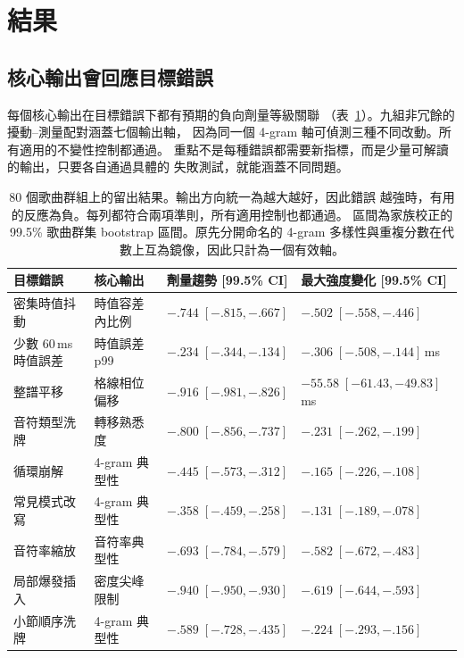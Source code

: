 \documentclass[10pt,twocolumn]{article}
\newcommand{\tabref}[1]{表~\ref{#1}}
\begin{document}
\section{結果}\label{sec:results}

\subsection{核心輸出會回應目標錯誤}
\label{sec:sensitivity}

每個核心輸出在目標錯誤下都有預期的負向劑量等級關聯
（\tabref{tab:confirmation}）。九組非冗餘的擾動--測量配對涵蓋七個輸出軸，
因為同一個 4-gram 軸可偵測三種不同改動。所有適用的不變性控制都通過。
重點不是每種錯誤都需要新指標，而是少量可解讀的輸出，只要各自通過具體的
失敗測試，就能涵蓋不同問題。

\begin{table}[t]
\centering
\scriptsize
\setlength{\tabcolsep}{3.5pt}
\begin{tabular}{@{}p{}p{}p{}p{}@{}}
\toprule
目標錯誤 & 核心輸出 & 劑量趨勢 [99.5\% CI] &
最大強度變化 [99.5\% CI] \\
\midrule
密集時值抖動 & 時值容差內比例 & $-.744\;[-.815,-.667]$ & $-.502\;[-.558,-.446]$ \\
少數 60\,ms 時值誤差 & 時值誤差 p99 & $-.234\;[-.344,-.134]$ & $-.306\;[-.508,-.144]$\,ms \\
整譜平移 & 格線相位偏移 & $-.916\;[-.981,-.826]$ & $-55.58\;[-61.43,-49.83]$\,ms \\
音符類型洗牌 & 轉移熟悉度 & $-.800\;[-.856,-.737]$ & $-.231\;[-.262,-.199]$ \\
循環崩解 & 4-gram 典型性 & $-.445\;[-.573,-.312]$ & $-.165\;[-.226,-.108]$ \\
常見模式改寫 & 4-gram 典型性 & $-.358\;[-.459,-.258]$ & $-.131\;[-.189,-.078]$ \\
音符率縮放 & 音符率典型性 & $-.693\;[-.784,-.579]$ & $-.582\;[-.672,-.483]$ \\
局部爆發插入 & 密度尖峰限制 & $-.940\;[-.950,-.930]$ & $-.619\;[-.644,-.593]$ \\
小節順序洗牌 & 4-gram 典型性 & $-.589\;[-.728,-.435]$ & $-.224\;[-.293,-.156]$ \\
\bottomrule
\end{tabular}
\caption{80 個歌曲群組上的留出結果。輸出方向統一為越大越好，因此錯誤
越強時，有用的反應為負。每列都符合兩項準則，所有適用控制也都通過。
區間為家族校正的 99.5\% 歌曲群集 bootstrap 區間。原先分開命名的
4-gram 多樣性與重複分數在代數上互為鏡像，因此只計為一個有效軸。}
\label{tab:confirmation}
\end{table}
\end{document}
